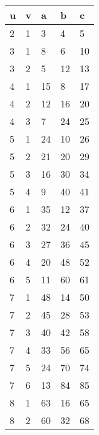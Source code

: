 \documentclass[letterpaper, 12pt]{article}
\theoremstyle{mystyle}
\begin{document}
\begin{tabular}{l l l l l}
    u   & v   & a   & b   & c   \\
    \hline
    2 & 1 & 3 & 4 & 5 \\
    3 & 1 & 8 & 6 & 10 \\
    3 & 2 & 5 & 12 & 13 \\
    4 & 1 & 15 & 8 & 17 \\
    4 & 2 & 12 & 16 & 20 \\
    4 & 3 & 7 & 24 & 25 \\
    5 & 1 & 24 & 10 & 26 \\
    5 & 2 & 21 & 20 & 29 \\
    5 & 3 & 16 & 30 & 34 \\
    5 & 4 & 9 & 40 & 41 \\
    6 & 1 & 35 & 12 & 37 \\
    6 & 2 & 32 & 24 & 40 \\
    6 & 3 & 27 & 36 & 45 \\
    6 & 4 & 20 & 48 & 52 \\
    6 & 5 & 11 & 60 & 61 \\
    7 & 1 & 48 & 14 & 50 \\
    7 & 2 & 45 & 28 & 53 \\
    7 & 3 & 40 & 42 & 58 \\
    7 & 4 & 33 & 56 & 65 \\
    7 & 5 & 24 & 70 & 74 \\
    7 & 6 & 13 & 84 & 85 \\
    8 & 1 & 63 & 16 & 65 \\
    8 & 2 & 60 & 32 & 68 \\
\end{tabular}
\quad
\end{document}
